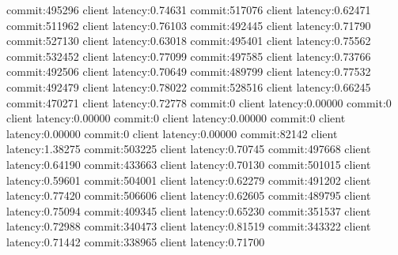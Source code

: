 commit:495296 client latency:0.74631
commit:517076 client latency:0.62471
commit:511962 client latency:0.76103
commit:492445 client latency:0.71790
commit:527130 client latency:0.63018
commit:495401 client latency:0.75562
commit:532452 client latency:0.77099
commit:497585 client latency:0.73766
commit:492506 client latency:0.70649
commit:489799 client latency:0.77532
commit:492479 client latency:0.78022
commit:528516 client latency:0.66245
commit:470271 client latency:0.72778
commit:0 client latency:0.00000
commit:0 client latency:0.00000
commit:0 client latency:0.00000
commit:0 client latency:0.00000
commit:0 client latency:0.00000
commit:82142 client latency:1.38275
commit:503225 client latency:0.70745
commit:497668 client latency:0.64190
commit:433663 client latency:0.70130
commit:501015 client latency:0.59601
commit:504001 client latency:0.62279
commit:491202 client latency:0.77420
commit:506606 client latency:0.62605
commit:489795 client latency:0.75094
commit:409345 client latency:0.65230
commit:351537 client latency:0.72988
commit:340473 client latency:0.81519
commit:343322 client latency:0.71442
commit:338965 client latency:0.71700